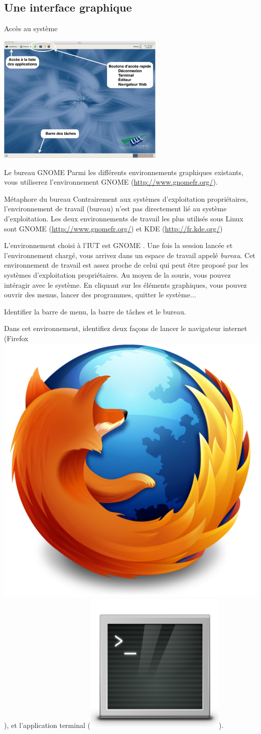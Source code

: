 \subsection{Une interface graphique}
\begin{frame}{Accès au système}
  \begin{center}
    \includegraphics[width=8cm]{img/s01/Gnome_desktop.jpg}
  \end{center}
  \begin{block}{Le bureau GNOME}
    Parmi les différents environnements graphiques existants, vous
    utiliserez l'environnement GNOME (\url{http://www.gnomefr.org/}).
  \end{block}
\end{frame}
\begin{exercice}
  \begin{exercicelet}{Métaphore du bureau}
    Contrairement aux systèmes d'exploitation propriétaires,
    l'environnement de travail (bureau) n'est pas directement lié au
    système d'exploitation. Les deux environnements de travail les plus
    utilisés sous Linux sont GNOME (\url{http://www.gnomefr.org/}) et
    KDE (\url{http://fr.kde.org/})
    
    L'environnement choisi à l'IUT est GNOME .  Une fois la session
    lancée et l'environnement chargé, vous arrivez dans un espace de
    travail appelé \emph{bureau}.  Cet environnement de travail est
    assez proche de celui qui peut être proposé par les systèmes
    d'exploitation propriétaires. Au moyen de la souris, vous pouvez
    intéragir avec le système. En cliquant sur les éléments graphiques,
    vous pouvez ouvrir des menus, lancer des programmes, quitter le
    système...
    \begin{questions}
    \item Identifier la barre de menu, la barre de tâches et le bureau.
    \item Dans cet environnement, identifiez deux façons de lancer le
      navigateur internet
      (Firefox \includegraphics[height=2ex]{img/s01/firefox.png}), et
      l'application terminal
      (\includegraphics[height=2ex]{img/s01/terminal.png}).
    \end{questions}
  \end{exercicelet}
\end{exercice}
